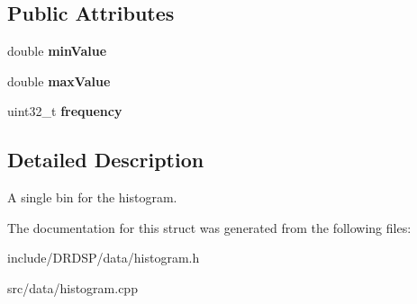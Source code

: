 \subsection*{Public Attributes}
\begin{DoxyCompactItemize}
\item 
\hypertarget{struct_d_r_d_s_p_1_1_bin_a5d097fae91de9385ff6899d8775e42de}{double {\bfseries min\-Value}}\label{struct_d_r_d_s_p_1_1_bin_a5d097fae91de9385ff6899d8775e42de}

\item 
\hypertarget{struct_d_r_d_s_p_1_1_bin_acb22aeeea00d388c4ae01094316549c4}{double {\bfseries max\-Value}}\label{struct_d_r_d_s_p_1_1_bin_acb22aeeea00d388c4ae01094316549c4}

\item 
\hypertarget{struct_d_r_d_s_p_1_1_bin_a64a0982f434f1f8826bf3b54b422519d}{uint32\-\_\-t {\bfseries frequency}}\label{struct_d_r_d_s_p_1_1_bin_a64a0982f434f1f8826bf3b54b422519d}

\end{DoxyCompactItemize}


\subsection{Detailed Description}
A single bin for the histogram. 

The documentation for this struct was generated from the following files\-:\begin{DoxyCompactItemize}
\item 
include/\-D\-R\-D\-S\-P/data/histogram.\-h\item 
src/data/histogram.\-cpp\end{DoxyCompactItemize}
